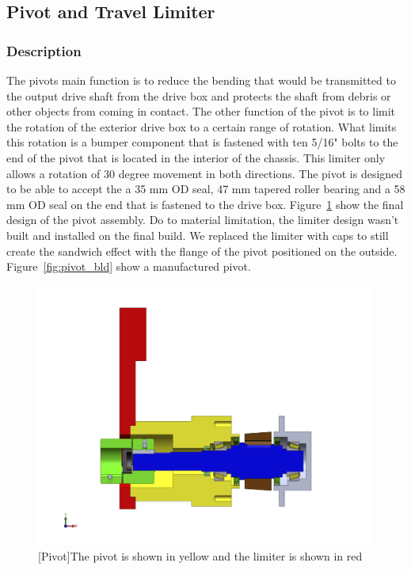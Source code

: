 \subsection{Pivot and Travel Limiter}

\subsubsection{Description}

The pivots main function is to reduce the bending that would be transmitted to the output drive shaft from the drive box and protects the shaft from debris or other objects from coming in contact. The other function of the pivot is to limit the rotation of the exterior drive box to a certain range of rotation. What limits this rotation is a bumper component that is fastened with ten 5/16" bolts to the end of the pivot that is located in the interior of the chassis. This limiter only allows a rotation of 30 degree movement in both directions. The pivot is designed to be able to accept the a 35 mm OD seal,  47 mm tapered roller bearing and a 58 mm OD seal on the end that is fastened to the drive box. Figure~\ref{fig:pivot_assembly_drw} show the final design of the pivot assembly. Do to material limitation, the limiter design wasn't built and installed on the final build. We replaced the limiter with caps to still create the sandwich effect with the flange of the pivot positioned on the outside. Figure~\ref{fig:pivot_bld} show a manufactured pivot.

\begin{figure}[htbp]
\centering
\includegraphics[height=0.3\textheight]{./images/pivot_assembly_drw}
[Pivot]{The pivot is shown in yellow and the limiter is shown in red}
\label{fig:pivot_assembly_drw}
\end{figure}

